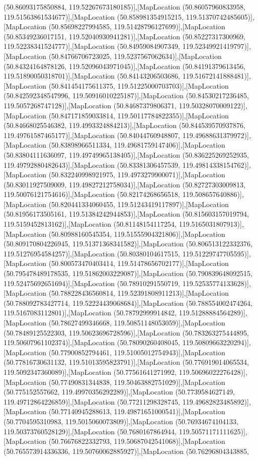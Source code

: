 (50.86093175850884, 119.52267673180185)],[MapLocation (50.86057960833958, 119.51563861534677)],[MapLocation (50.858981354915215, 119.51370742485605)],[MapLocation (50.85698227994585, 119.51428796127699)],[MapLocation (50.85349236017151, 119.52040930941281)],[MapLocation (50.85227317300969, 119.52238341524777)],[MapLocation (50.84959084907349, 119.52349921419797)],[MapLocation (50.84766706723025, 119.5237567062634)],[MapLocation (50.84324164878126, 119.52096043971045)],[MapLocation (50.84191379613456, 119.51890050318701)],[MapLocation (50.84143206503686, 119.51672141888481)],[MapLocation (50.841454175611375, 119.51225000703703)],[MapLocation (50.842592348547996, 119.50916010225187)],[MapLocation (50.84530217236485, 119.5057268747128)],[MapLocation (50.84687379806371, 119.50328070009122)],[MapLocation (50.847171859033814, 119.50117784822355)],[MapLocation (50.84668025546382, 119.4993324884213)],[MapLocation (50.844539570937876, 119.49761587465177)],[MapLocation (50.84044760948807, 119.49688631379972)],[MapLocation (50.83898966511334, 119.49681759147406)],[MapLocation (50.83804111636097, 119.49749965138405)],[MapLocation (50.836225269252935, 119.49792880482643)],[MapLocation (50.83381306457539, 119.49814338154762)],[MapLocation (50.832240998921975, 119.4973279900071)],[MapLocation (50.83011927509009, 119.49827212758034)],[MapLocation (50.82727303009813, 119.50076121754616)],[MapLocation (50.82174268656518, 119.508657640886)],[MapLocation (50.820441334060455, 119.51243419117897)],[MapLocation (50.81956173505161, 119.51384242944853)],[MapLocation (50.815603157019794, 119.5159452813162)],[MapLocation (50.81148154117254, 119.5165031807913)],[MapLocation (50.80988160545354, 119.51555904321806)],[MapLocation (50.809170804226945, 119.51371368341582)],[MapLocation (50.806513122332376, 119.51276954584257)],[MapLocation (50.80380104617515, 119.51229747705595)],[MapLocation (50.800573470403414, 119.51478656702177)],[MapLocation (50.795478489178535, 119.51862003229087)],[MapLocation (50.790839648092515, 119.52475692651694)],[MapLocation (50.78910291550719, 119.52535774133628)],[MapLocation (50.788228436560814, 119.52391808911213)],[MapLocation (50.788092783427714, 119.52224439068684)],[MapLocation (50.788554002474264, 119.5167083112801)],[MapLocation (50.78792999914842, 119.51288884564289)],[MapLocation (50.78627499346668, 119.50851148053059)],[MapLocation (50.78489125522303, 119.50623696728596)],[MapLocation (50.783263275444895, 119.50607961102374)],[MapLocation (50.78090260408045, 119.50809663220294)],[MapLocation (50.77900852794461, 119.51005012754943)],[MapLocation (50.77816730631132, 119.51013595823791)],[MapLocation (50.776919014065534, 119.5092347360089)],[MapLocation (50.77561641271992, 119.50696022276428)],[MapLocation (50.77490831344838, 119.50463882751029)],[MapLocation (50.775152557662, 119.49970356292289)],[MapLocation (50.7739584627149, 119.49712864226859)],[MapLocation (50.77211298328745, 119.49682823485892)],[MapLocation (50.77140945288613, 119.49871651000541)],[MapLocation (50.7704595310983, 119.5015060073809)],[MapLocation (50.76934674104133, 119.50373760528129)],[MapLocation (50.7680167864944, 119.50571171111625)],[MapLocation (50.76676822332793, 119.50687042541068)],[MapLocation (50.765573914336336, 119.50760062885927)],[MapLocation (50.76296804343885, 